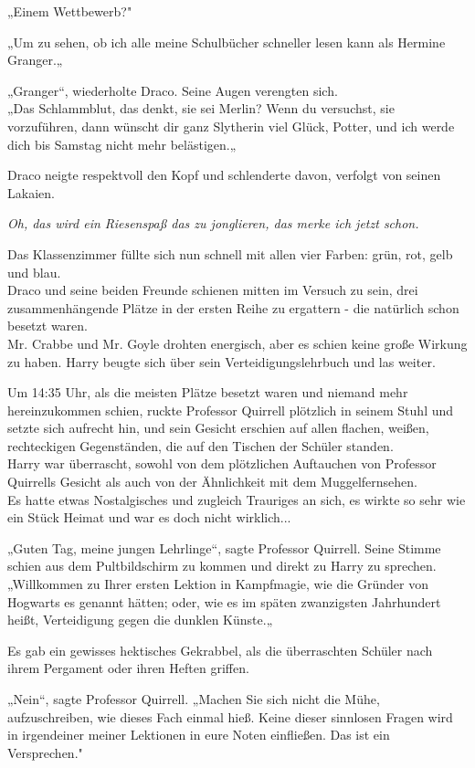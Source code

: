 {„Einem Wettbewerb?"

„Um zu sehen, ob ich alle meine Schulbücher schneller lesen kann als Hermine Granger.„

„Granger“, wiederholte Draco. Seine Augen verengten sich.\\ „Das Schlammblut, das denkt, sie sei Merlin? Wenn du versuchst, sie vorzuführen, dann wünscht dir ganz Slytherin viel Glück, Potter, und ich werde dich bis Samstag nicht mehr belästigen.„

Draco neigte respektvoll den Kopf und schlenderte davon, verfolgt von seinen Lakaien.

\emph{Oh, das wird ein Riesenspaß das zu jonglieren, das merke ich jetzt schon.}

Das Klassenzimmer füllte sich nun schnell mit allen vier Farben: grün, rot, gelb und blau.\\ Draco und seine beiden Freunde schienen mitten im Versuch zu sein, drei zusammenhängende Plätze in der ersten Reihe zu ergattern - die natürlich schon besetzt waren.\\ Mr. Crabbe und Mr. Goyle drohten energisch, aber es schien keine große Wirkung zu haben. Harry beugte sich über sein Verteidigungslehrbuch und las weiter.

Um 14:35 Uhr, als die meisten Plätze besetzt waren und niemand mehr hereinzukommen schien, ruckte Professor Quirrell plötzlich in seinem Stuhl und setzte sich aufrecht hin, und sein Gesicht erschien auf allen flachen, weißen, rechteckigen Gegenständen, die auf den Tischen der Schüler standen.\\ Harry war überrascht, sowohl von dem plötzlichen Auftauchen von Professor Quirrells Gesicht als auch von der Ähnlichkeit mit dem Muggelfernsehen.\\ Es hatte etwas Nostalgisches und zugleich Trauriges an sich, es wirkte so sehr wie ein Stück Heimat und war es doch nicht wirklich...

„Guten Tag, meine jungen Lehrlinge“, sagte Professor Quirrell. Seine Stimme schien aus dem Pultbildschirm zu kommen und direkt zu Harry zu sprechen.\\ „Willkommen zu Ihrer ersten Lektion in Kampfmagie, wie die Gründer von Hogwarts es genannt hätten; oder, wie es im späten zwanzigsten Jahrhundert heißt, Verteidigung gegen die dunklen Künste.„

Es gab ein gewisses hektisches Gekrabbel, als die überraschten Schüler nach ihrem Pergament oder ihren Heften griffen.

„Nein“, sagte Professor Quirrell. „Machen Sie sich nicht die Mühe, aufzuschreiben, wie dieses Fach einmal hieß. Keine dieser sinnlosen Fragen wird in irgendeiner meiner Lektionen in eure Noten einfließen. Das ist ein Versprechen."

}
